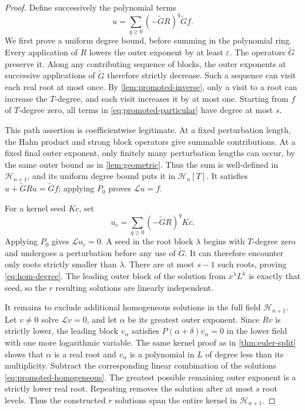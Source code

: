 \documentclass[11pt,a4paper]{article}
\numberwithin{equation}{section}
\theoremstyle{definition}
\theoremstyle{remark}
\newcommand{\HH}{\mathcal H}
\newcommand{\cL}{\mathcal L}
\newcommand{\eps}{\varepsilon}
\begin{document}
\begin{proof}
Define successively the polynomial terms
\begin{equation}
 u=\sum_{q\ge0}(-\widetilde G R)^q\widetilde G f.
 \label{eq:promoted-particular}
\end{equation}
We first prove a uniform degree bound, before summing in the polynomial ring. Every application of $R$ lowers the outer exponent by at least $\eps$. The operators $\widetilde G$ preserve it. Along any contributing sequence of blocks, the outer exponents at successive applications of $\widetilde G$ therefore strictly decrease. Such a sequence can visit each real root at most once. By \cref{lem:promoted-inverse}, only a visit to a root can increase the $T$-degree, and each visit increases it by at most one. Starting from $f$ of $T$-degree zero, all terms in \eqref{eq:promoted-particular} have degree at most $s$.

This path assertion is coefficientwise legitimate. At a fixed perturbation length, the Hahn product and strong block operators give summable contributions. At a fixed final outer exponent, only finitely many perturbation lengths can occur, by the same outer bound as in \cref{lem:geometric}. Thus the sum is well-defined in $\HH_{n+1}$, and its uniform degree bound puts it in $\HH_n[T]$. It satisfies
$u+\widetilde G Ru=\widetilde G f$; applying $P_0$ proves $\cL u=f$.

For a kernel seed $Kc$, set
\begin{equation}
 u_c=\sum_{q\ge0}(-\widetilde G R)^qKc.
 \label{eq:promoted-homogeneous}
\end{equation}
Applying $P_0$ gives $\cL u_c=0$. A seed in the root block $\lambda$ begins with $T$-degree zero and undergoes a perturbation before any use of $\widetilde G$. It can therefore encounter only roots strictly smaller than $\lambda$. There are at most $s-1$ such roots, proving \eqref{eq:hom-degree}. The leading outer block of the solution from $x^\lambda L^k$ is exactly that seed, so the $r$ resulting solutions are linearly independent.

It remains to exclude additional homogeneous solutions in the full field $\HH_{n+1}$. Let $v\ne0$ solve $\cL v=0$, and let $\alpha$ be its greatest outer exponent. Since $Rv$ is strictly lower, the leading block $v_\alpha$ satisfies $P(\alpha+\delta)v_\alpha=0$ in the lower field with one more logarithmic variable. The same kernel proof as in \cref{thm:euler-split} shows that $\alpha$ is a real root and $v_\alpha$ is a polynomial in $L$ of degree less than its multiplicity. Subtract the corresponding linear combination of the solutions \eqref{eq:promoted-homogeneous}. The greatest possible remaining outer exponent is a strictly lower real root. Repeating removes the solution after at most $s$ root levels. Thus the constructed $r$ solutions span the entire kernel in $\HH_{n+1}$.


\end{proof}
\end{document}

